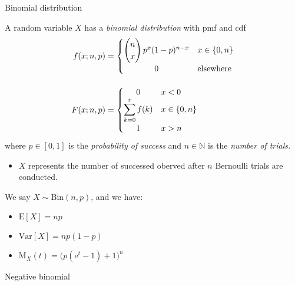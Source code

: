 \documentclass[8pt, handout]{beamer}
\renewcommand{\emph}[1]{\textcolor{defcol}{\textsl{#1}}}
\begin{document}
\begin{frame}{Binomial distribution}

    A random variable \(X\) has a \emph{binomial distribution} with pmf and cdf 
    \begin{align*}
        f(x;n,p) &= \begin{cases}
            \begin{pmatrix}
                n \\ x
            \end{pmatrix} p^x (1 - p)^{n - x} & x \in \{ 0, n \} \\
                \hfil 0 & \text{elsewhere}
        \end{cases} \\[1em]
        F(x;n,p) &=  \begin{cases}
            \hfil 0 & x < 0 \\
            \displaystyle \sum_{k=0}^x f(k) & x \in \{0, n\} \\
            \hfil 1 & x > n
        \end{cases}
    \end{align*}
    where \(p \in [0,1]\) is the \emph{probability of success} and \(n \in \mathbb{N}\) is the \emph{number of trials.}
    \begin{itemize}
        \item \(X\) represents the number of successed oberved after \(n\) Bernoulli trials are conducted. 
    \end{itemize}

    \vspace{2em}
    We say \(X \sim \mathrm{Bin}(n,p)\), and we have:
    \begin{itemize}
        \item \(\mathrm{E}[X] = np\)
        \item \(\mathrm{Var}[X] = np(1 - p)\)
        \item \(\mathrm{M}_X(t) = \big( p(\mathrm{e}^t - 1) + 1 \big)^n\)
    \end{itemize}

\end{frame}

\begin{frame}{Negative binomial}

    

\end{frame}
\end{document}
